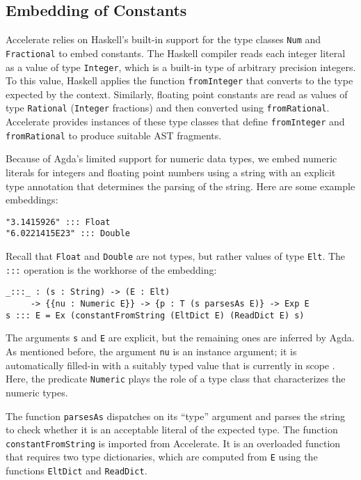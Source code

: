 \documentclass{llncs}
\begin{document}
\subsection{Embedding of Constants}
\label{sec:embedding-constants}


Accelerate relies on Haskell's built-in support for the type classes
\texttt{Num} and \texttt{Fractional} to embed constants. The Haskell
compiler reads each integer literal as a value of type
\texttt{Integer}, which is a built-in type of arbitrary precision
integers. To this value, Haskell applies the function
\texttt{fromInteger} that converts to the type expected by the
context. Similarly, floating point constants are read as values of
type \texttt{Rational} (\texttt{Integer} fractions) and then converted
using \texttt{fromRational}. Accelerate provides instances of these
type classes that define \texttt{fromInteger} and
\texttt{fromRational} to produce suitable AST fragments.

Because of Agda's limited support for numeric data types,
we embed numeric literals for integers and floating point numbers
using a string with an explicit type annotation that determines the
parsing of the string. Here are some example embeddings:
\begin{verbatim}
"3.1415926" ::: Float
"6.0221415E23" ::: Double
\end{verbatim}
Recall that \texttt{Float} and \texttt{Double} are not
types, but rather values of type \texttt{Elt}.
The \texttt{:::} operation is the workhorse of the embedding:
\begin{verbatim}
_:::_ : (s : String) -> (E : Elt) 
     -> {{nu : Numeric E}} -> {p : T (s parsesAs E)} -> Exp E
s ::: E = Ex (constantFromString (EltDict E) (ReadDict E) s)
\end{verbatim}
The arguments \texttt{s} and \texttt{E} are explicit, but the
remaining ones are inferred by Agda.
As mentioned before, the argument \texttt{nu} is an instance argument; it is automatically
filled-in with a suitably typed value that is currently in scope
\cite{DevriesePiessens2011}. Here, the predicate 
\texttt{Numeric} plays the role of a type class that characterizes
the numeric types.

The function \texttt{parsesAs} dispatches on its ``type'' argument and
parses the string to check whether it is an acceptable literal of the expected type. The
function \texttt{constantFromString} is imported from Accelerate.
It is an overloaded function that requires two type dictionaries,
which are computed from \texttt{E} using the functions \texttt{EltDict}
and \texttt{ReadDict}. 
\end{document}
